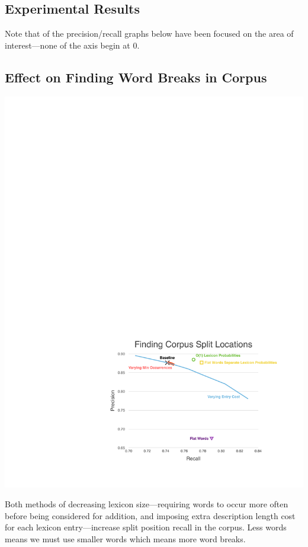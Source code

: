 \documentclass[11pt, oneside, fleqn]{article}
\begin{document}
	\pagebreak

  \subsection{Experimental Results}
  
  Note that of the precision/recall graphs below have been focused on the area of interest---none of the axis begin at 0.
  
  \subsection{Effect on Finding Word Breaks in Corpus}

	\vspace{1em}
  \includegraphics[scale=0.9]{./figure/finding_corpus_split_location.pdf}
  
  Both methods of decreasing lexicon size---requiring words to occur more often before being considered for addition, and imposing extra description length cost for each lexicon entry---increase split position recall in the corpus. Less words means we must use smaller words which means more word breaks.
 
\end{document}
